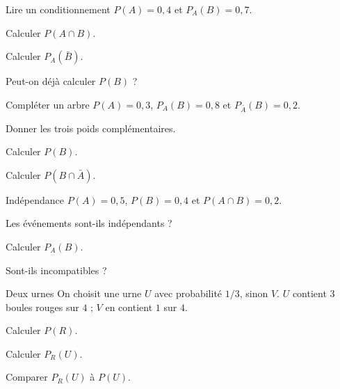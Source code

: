 \exercices
{}
\begingroup\renewcommand{\otBesoinPlace}[1]{}\begin{minipage}{\linewidth}
\begin{exercice}[1]{Lire un conditionnement}
$P(A)=0{,}4$ et $P_A(B)=0{,}7$.
\begin{questions}
\item Calculer $P(A\cap B)$.
\item Calculer $P_A(\bar B)$.
\item Peut-on déjà calculer $P(B)$ ?
\end{questions}
\end{exercice}
\begin{exercice}[1]{Compléter un arbre}
$P(A)=0{,}3$, $P_A(B)=0{,}8$ et $P_{\bar A}(B)=0{,}2$.
\begin{questions}
\item Donner les trois poids complémentaires.
\item Calculer $P(B)$.
\item Calculer $P(B\cap\bar A)$.
\end{questions}
\end{exercice}
\begin{exercice}[1]{Indépendance}
$P(A)=0{,}5$, $P(B)=0{,}4$ et $P(A\cap B)=0{,}2$.
\begin{questions}
\item Les événements sont-ils indépendants ?
\item Calculer $P_A(B)$.
\item Sont-ils incompatibles ?
\end{questions}
\end{exercice}
\begin{exercice}[1]{Deux urnes}
On choisit une urne $U$ avec probabilité $1/3$, sinon $V$. $U$ contient $3$ boules rouges sur $4$ ; $V$ en contient $1$ sur $4$.
\begin{questions}
\item Calculer $P(R)$.
\item Calculer $P_R(U)$.
\item Comparer $P_R(U)$ à $P(U)$.
\end{questions}
\end{exercice}
\end{minipage}\endgroup
\clearpage
{}
